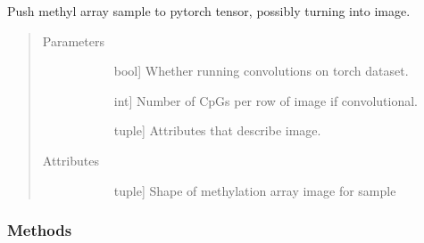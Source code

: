\documentclass[letterpaper,10pt,english]{sphinxmanual}
\begin{document}
\begin{fulllineitems}
\label{\detokenize{index:methylnet.datasets.Transformer}}
Push methyl array sample to pytorch tensor, possibly turning into image.
\begin{quote}\begin{description}
\item[{Parameters}] \leavevmode\begin{description}
\item[{}] \leavevmode{[}bool{]}
Whether running convolutions on torch dataset.

\item[{}] \leavevmode{[}int{]}
Number of CpGs per row of image if convolutional.

\item[{}] \leavevmode{[}tuple{]}
Attributes that describe image.

\end{description}

\item[{Attributes}] \leavevmode\begin{description}
\item[{}] \leavevmode{[}tuple{]}
Shape of methylation array image for sample

\item[{}] \leavevmode
\item[{}] \leavevmode
\item[{}] \leavevmode
\end{description}

\end{description}\end{quote}
\subsubsection*{Methods}


\begin{savenotes}\sphinxatlongtablestart\begin{longtable}{}
\hline

\endfirsthead


\end{longtable}
\end{savenotes}
\end{fulllineitems}
\end{document}

